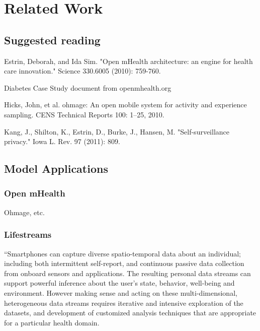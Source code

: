 \section{Related Work}


\subsection{Suggested reading}

Estrin, Deborah, and Ida Sim. "Open mHealth architecture: an engine for health care innovation." Science 330.6005 (2010): 759-760.

Diabetes Case Study document from openmhealth.org 

Hicks, John, et al. ohmage: An open mobile system for activity and experience sampling. CENS Technical Reports 100: 1–25, 2010.

Kang, J., Shilton, K., Estrin, D., Burke, J., Hansen, M. "Self-surveillance privacy." Iowa L. Rev. 97 (2011): 809.

\subsection{Model Applications}

\subsubsection{Open mHealth}
Ohmage, etc.

\subsubsection{Lifestreams}

``Smartphones can capture diverse spatio-temporal data about an individual; including both intermittent self-report, and continuous passive data collection from onboard sensors and applications. The resulting personal data streams can support powerful inference about the user's state, behavior, well-being and environment. However making sense and acting on these multi-dimensional, heterogeneous data streams requires iterative and intensive exploration of the datasets, and development of customized analysis techniques that are appropriate for a particular health domain.

